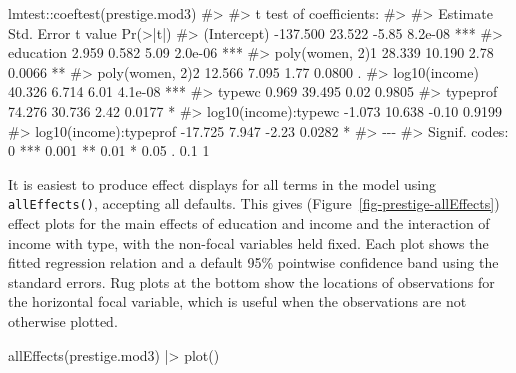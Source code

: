 \documentclass[
  letterpaper,
  10pt,
  krantz2]{krantz}
\makeatletter
\newenvironment{Shaded}{\begin{snugshade}}{\end{snugshade}}
\newcommand{\CommentTok}[1]{\textcolor[rgb]{0.37,0.37,0.37}{#1}}
\newcommand{\FunctionTok}[1]{\textcolor[rgb]{0.28,0.35,0.67}{#1}}
\newcommand{\NormalTok}[1]{\textcolor[rgb]{0.00,0.23,0.31}{#1}}
\newcommand{\SpecialCharTok}[1]{\textcolor[rgb]{0.37,0.37,0.37}{#1}}
\newenvironment{kframe}{%
  \medskip{}
  \setlength{\fboxsep}{.8em}
  \def\at@end@of@kframe{}%
  \ifinner\ifhmode%
  \def\at@end@of@kframe{\end{minipage}}%
  \begin{minipage}{\columnwidth}%
  \fi\fi%
  \def\FrameCommand##1{\hskip\@totalleftmargin \hskip-\fboxsep
  \colorbox{shadecolor}{##1}\hskip-\fboxsep
      \hskip-\linewidth \hskip-\@totalleftmargin \hskip\columnwidth}%
  \MakeFramed {\advance\hsize-\width
    \@totalleftmargin\z@ \linewidth\hsize
    \@setminipage}}%
{\par\unskip\endMakeFramed%
  \at@end@of@kframe}
\renewenvironment{Shaded}{\begin{kframe}}{\end{kframe}}
\makeatother
\begin{document}
\begin{Shaded}
\begin{Highlighting}[]
\NormalTok{lmtest}\SpecialCharTok{::}\FunctionTok{coeftest}\NormalTok{(prestige.mod3)}
\CommentTok{\#\textgreater{} }
\CommentTok{\#\textgreater{} t test of coefficients:}
\CommentTok{\#\textgreater{} }
\CommentTok{\#\textgreater{}                        Estimate Std. Error t value Pr(\textgreater{}|t|)    }
\CommentTok{\#\textgreater{} (Intercept)            {-}137.500     23.522   {-}5.85  8.2e{-}08 ***}
\CommentTok{\#\textgreater{} education                 2.959      0.582    5.09  2.0e{-}06 ***}
\CommentTok{\#\textgreater{} poly(women, 2)1          28.339     10.190    2.78   0.0066 ** }
\CommentTok{\#\textgreater{} poly(women, 2)2          12.566      7.095    1.77   0.0800 .  }
\CommentTok{\#\textgreater{} log10(income)            40.326      6.714    6.01  4.1e{-}08 ***}
\CommentTok{\#\textgreater{} typewc                    0.969     39.495    0.02   0.9805    }
\CommentTok{\#\textgreater{} typeprof                 74.276     30.736    2.42   0.0177 *  }
\CommentTok{\#\textgreater{} log10(income):typewc     {-}1.073     10.638   {-}0.10   0.9199    }
\CommentTok{\#\textgreater{} log10(income):typeprof  {-}17.725      7.947   {-}2.23   0.0282 *  }
\CommentTok{\#\textgreater{} {-}{-}{-}}
\CommentTok{\#\textgreater{} Signif. codes:  0 \textquotesingle{}***\textquotesingle{} 0.001 \textquotesingle{}**\textquotesingle{} 0.01 \textquotesingle{}*\textquotesingle{} 0.05 \textquotesingle{}.\textquotesingle{} 0.1 \textquotesingle{} \textquotesingle{} 1}
\end{Highlighting}
\end{Shaded}

It is easiest to produce effect displays for all terms in the model
using \texttt{allEffects()}, accepting all defaults. This gives
(Figure~\ref{fig-prestige-allEffects}) effect plots for the main effects
of education and income and the interaction of income with type, with
the non-focal variables held fixed. Each plot shows the fitted
regression relation and a default 95\% pointwise confidence band using
the standard errors. Rug plots at the bottom show the locations of
observations for the horizontal focal variable, which is useful when the
observations are not otherwise plotted.

\begin{Shaded}
\begin{Highlighting}[]
\FunctionTok{allEffects}\NormalTok{(prestige.mod3) }\SpecialCharTok{|\textgreater{}}
  \FunctionTok{plot}\NormalTok{()}
\end{Highlighting}
\end{Shaded}
\end{document}

